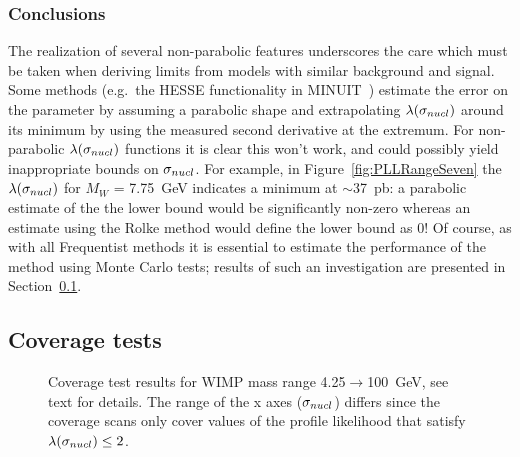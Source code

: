 		\subsubsection{Conclusions}
		\label{sec:LLPathoConclusions}

The realization of several non-parabolic features underscores the care which must be taken when deriving limits from models with similar background and signal.  Some methods (e.g.~the HESSE functionality in MINUIT~\cite{James:1975dr}) estimate the error on the parameter by assuming a parabolic shape and extrapolating $\lambda(\sigma_{nucl})$ around its minimum by using the measured second derivative at the extremum.  For non-parabolic $\lambda(\sigma_{nucl})$ functions it is clear this won't work, and could possibly yield inappropriate bounds on $\sigma_{nucl}$.  For example, in Figure~\ref{fig:PLLRangeSeven} the $\lambda(\sigma_{nucl})$ for $M_{W}$ = 7.75~GeV indicates a minimum at $\sim$37~pb: a parabolic estimate of the the lower bound would be significantly non-zero %
whereas an estimate using the Rolke method would define the lower bound as 0!  Of course, as with all Frequentist methods it is essential to estimate the performance of the method using Monte Carlo tests; results of such an investigation are presented in Section~\ref{sec:LimitsCoverageTests}.

	\subsection{Coverage tests}
	\label{sec:LimitsCoverageTests}			

		\begin{sidewaysfigure}
			\centering
			\caption[Coverage test results for WIMP mass range 4.25$\to$100~GeV]
			{Coverage test results for WIMP mass range 4.25$\to$100~GeV, see text for details. The range of the x axes ($\sigma_{nucl}$) differs since the coverage scans only
			cover values of the profile likelihood that satisfy $\lambda(\sigma_{nucl}) \leq 2$.}
			\label{fig:CoverageTestResults}
		\end{sidewaysfigure}

